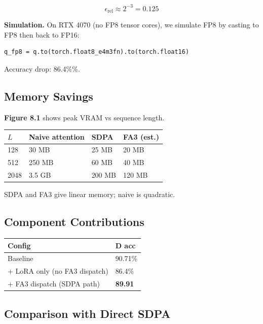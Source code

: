 \[
\epsilon_{\text{rel}} \approx 2^{-3} = 0.125
\]

\textbf{Simulation.} On RTX 4070 (no FP8 tensor cores), we simulate FP8 by 
casting to FP8 then back to FP16:

\begin{lstlisting}
q_fp8 = q.to(torch.float8_e4m3fn).to(torch.float16)
\end{lstlisting}

Accuracy drop: 86.4\%\%.

\subsection{Memory Savings}

\textbf{Figure 8.1} shows peak VRAM vs sequence length.

\begin{table}[H]
\centering
\small
\begin{tabular}{llll}
\toprule
\textbf{$L$} & \textbf{Naive attention} & \textbf{SDPA} & \textbf{FA3 (est.)} \\
\midrule
128 & 30 MB & 25 MB & 20 MB \\
512 & 250 MB & 60 MB & 40 MB \\
2048 & 3.5 GB & 200 MB & 120 MB \\
\bottomrule
\end{tabular}
\end{table}

SDPA and FA3 give linear memory; naive is quadratic.

\subsection{Component Contributions}

\begin{table}[H]
\centering
\small
\begin{tabular}{ll}
\toprule
\textbf{Config} & \textbf{D acc} \\
\midrule
Baseline & 90.71\% \\
+ LoRA only (no FA3 dispatch) & 86.4\% \\
+ FA3 dispatch (SDPA path) & \textbf{89.91} \\
\bottomrule
\end{tabular}
\end{table}

\subsection{Comparison with Direct SDPA}


